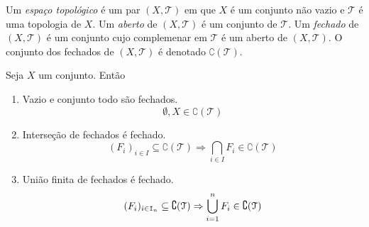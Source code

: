 \begin{defi}
	Um \emph{espaço topológico} é um par $(X,\mathcal T)$ em que $X$ é um conjunto não vazio e $\mathcal T$ é uma topologia de $X$. Um \emph{aberto} de $(X,\mathcal T)$ é um conjunto de $\mathcal T$. Um \emph{fechado} de $(X,\mathcal T)$ é um conjunto cujo complemenar em $\mathcal T$ é um aberto de $(X,\mathcal T)$. O conjunto dos fechados de $(X,\mathcal T)$ é denotado $\complement (\mathcal T)$.
\end{defi}

\begin{prop}
	Seja $X$ um conjunto. Então
	\begin{enumerate}
	\item Vazio e conjunto todo são fechados.
	\begin{equation*}
	\emptyset, X \in \complement (\mathcal T)
	\end{equation*}

	\item Interseção de fechados é fechado.
	\begin{equation*}
	(F_i)_{i \in I} \subseteq \complement (\mathcal T) \Rightarrow \bigcap_{i \in I} F_i  \in \complement (\mathcal T)
	\end{equation*}
	
	\item União finita de fechados é fechado.
	\begin{equation*}
	(F_i)_{i \in \mathtt I_n} \subseteq \complement (\mathcal T) \Rightarrow \bigcup_{i=1}^n F_i \in \complement (\mathcal T)
	\end{equation*}
	

	\end{enumerate}
\end{prop}
